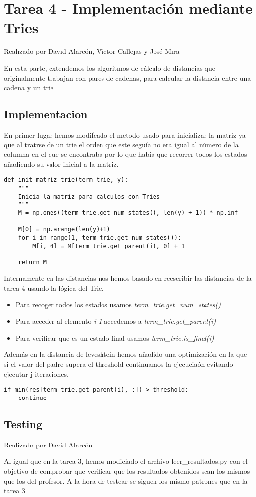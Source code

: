 \section{Tarea 4 - Implementación mediante Tries}
{\color{red}Realizado por David Alarcón, Víctor Callejas y José Mira}

En esta parte, extendemos los algoritmos de cálculo de distancias que originalmente trabajan con pares de cadenas, para
calcular la distancia entre una cadena y un trie
\subsection{Implementacion}
En primer lugar hemos modifcado el metodo usado para inicializar la matriz ya que al tratrse de un trie el orden que este seguía no era igual al número de la columna en el que se encontraba por lo que había que recorrer todos los estados añadiendo su valor inicial a la matriz.

\begin{lstlisting}[caption=Método init{\_}matriz{\_}trie en \emph{/utils/utils.py}]
def init_matriz_trie(term_trie, y):
    """
    Inicia la matriz para calculos con Tries
    """
    M = np.ones((term_trie.get_num_states(), len(y) + 1)) * np.inf

    M[0] = np.arange(len(y)+1)
    for i in range(1, term_trie.get_num_states()):
        M[i, 0] = M[term_trie.get_parent(i), 0] + 1

    return M
\end{lstlisting}

Internamente en las distancias nos hemos basado en reescribir las distancias de la tarea 4 usando la lógica del Trie.
\begin{itemize}
  \item Para recoger todos los estados usamos \emph{term\_trie.get\_num\_states()}
  \item Para acceder al elemento \emph{i-1} accedemos a \emph{term\_trie.get\_parent(i)}
  \item Para verificar que es un estado final usamos \emph{term\_trie.is\_final(i)}
\end{itemize}

Además en la distancia de leveshtein hemos añadido una optimización en la que si el valor del padre supera el threshold continuamos la ejecuciaón evitando ejecutar j iteraciones.
\begin{lstlisting}[caption=Optimización levenshtein tipo trie]
if min(res[term_trie.get_parent(i), :]) > threshold:
    continue
\end{lstlisting}


\subsection{Testing}
{\color{red}Realizado por David Alarcón}

Al igual que en la tarea 3, hemos modiciado el archivo leer{\_}resultados.py con el objetivo de comprobar que verificar que los resultados obtenidos sean los mismos que los del profesor. A la hora de testear se siguen los mismo patrones que en la tarea 3


\newpage